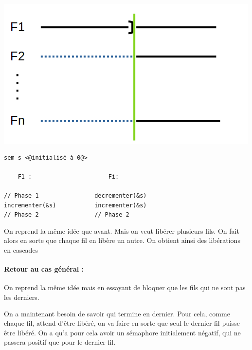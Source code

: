\includegraphics[scale=0.5]{Developpements/probleme du rdv/deuxieme_cas.png}\\

\begin{minipage}{0.6\linewidth}
\begin{lstlisting}
sem s <@initialisé à 0@>

    F1 :                      Fi:
    
// Phase 1                decrementer(&s)
incrementer(&s)           incrementer(&s)
// Phase 2                // Phase 2
\end{lstlisting}

\end{minipage}
\enspace
\begin{minipage}{0.35\linewidth}
\begin{com}
	On reprend la même idée que avant. Mais on veut libérer plusieurs fils. On fait alors en sorte que chaque fil en libère un autre. On obtient ainsi des libérations en cascades
\end{com}
\end{minipage}

\paragraph{Retour au cas général :} On reprend la même idée mais en essayant de bloquer que les fils qui ne sont pas les derniers.
\begin{com}
	On a maintenant besoin de savoir qui termine en dernier. Pour cela, comme chaque fil, attend d'être libéré, on va faire en sorte que seul le dernier fil puisse être libéré. On a qu'a pour cela avoir un sémaphore initialement négatif, qui ne passera positif que pour le dernier fil.
\end{com}

